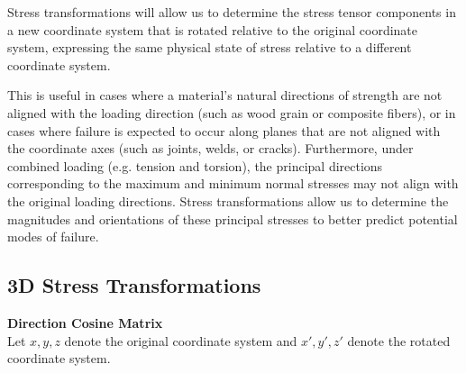 ﻿\documentclass[12pt]{article}
\begin{document}
Stress transformations will allow us to determine the stress tensor components in a new coordinate system that is rotated relative to the original coordinate system, expressing the same physical state of stress relative to a different coordinate system.

This is useful in cases where a material's natural directions of strength are not aligned with the loading direction (such as wood grain or composite fibers), or in cases where failure is expected to occur along planes that are not aligned with the coordinate axes (such as joints, welds, or cracks). Furthermore, under combined loading (e.g. tension and torsion), the principal directions corresponding to the maximum and minimum normal stresses may not align with the original loading directions. Stress transformations allow us to determine the magnitudes and orientations of these principal stresses to better predict potential modes of failure.
\subsection*{3D Stress Transformations}
\textbf{Direction Cosine Matrix}\\
Let \(x,y,z\) denote the original coordinate system and \(x',y',z'\) denote the rotated coordinate system.
\end{document}
